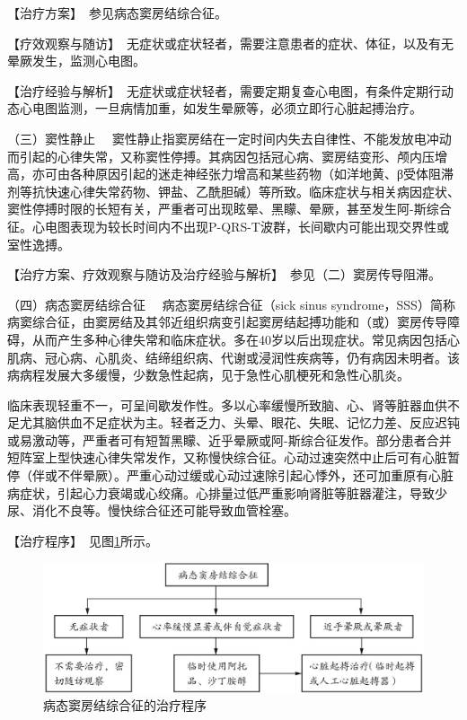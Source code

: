 【治疗方案】　参见病态窦房结综合征。

【疗效观察与随访】　无症状或症状轻者，需要注意患者的症状、体征，以及有无晕厥发生，监测心电图。

【治疗经验与解析】　无症状或症状轻者，需要定期复查心电图，有条件定期行动态心电图监测，一旦病情加重，如发生晕厥等，必须立即行心脏起搏治疗。

{（三）窦性静止}
　窦性静止指窦房结在一定时间内失去自律性、不能发放电冲动而引起的心律失常，又称窦性停搏。其病因包括冠心病、窦房结变形、颅内压增高，亦可由各种原因引起的迷走神经张力增高和某些药物（如洋地黄、β受体阻滞剂等抗快速心律失常药物、钾盐、乙酰胆碱）等所致。临床症状与相关病因症状、窦性停搏时限的长短有关，严重者可出现眩晕、黑矇、晕厥，甚至发生阿-斯综合征。心电图表现为较长时间内不出现P-QRS-T波群，长间歇内可能出现交界性或室性逸搏。

【治疗方案、疗效观察与随访及治疗经验与解析】　参见（二）窦房传导阻滞。

{（四）病态窦房结综合征} 　病态窦房结综合征（sick sinus
syndrome，SSS）简称病窦综合征，由窦房结及其邻近组织病变引起窦房结起搏功能和（或）窦房传导障碍，从而产生多种心律失常和临床症状。多在40岁以后出现症状。常见病因包括心肌病、冠心病、心肌炎、结缔组织病、代谢或浸润性疾病等，仍有病因未明者。该病病程发展大多缓慢，少数急性起病，见于急性心肌梗死和急性心肌炎。

临床表现轻重不一，可呈间歇发作性。多以心率缓慢所致脑、心、肾等脏器血供不足尤其脑供血不足症状为主。轻者乏力、头晕、眼花、失眠、记忆力差、反应迟钝或易激动等，严重者可有短暂黑矇、近乎晕厥或阿-斯综合征发作。部分患者合并短阵室上型快速心律失常发作，又称慢快综合征。心动过速突然中止后可有心脏暂停（伴或不伴晕厥）。严重心动过缓或心动过速除引起心悸外，还可加重原有心脏病症状，引起心力衰竭或心绞痛。心排量过低严重影响肾脏等脏器灌注，导致少尿、消化不良等。慢快综合征还可能导致血管栓塞。

【治疗程序】　见图\ref{fig2-2-3}所示。

\begin{figure}[!htbp]
 \centering
 \includegraphics{./images/Image00048.jpg}
 \captionsetup{justification=centering}
 \caption{病态窦房结综合征的治疗程序}
 \label{fig2-2-3}
  \end{figure} 

